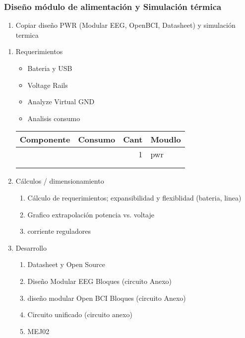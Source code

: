 \documentclass[11pt]{article}
\begin{document}
\subsubsection{Diseño módulo de alimentación y Simulación térmica}
\label{sec:org45edac0}
\begin{enumerate}
\item Copiar diseño PWR (Modular EEG, OpenBCI, Datasheet) y simulación termica\\
\end{enumerate}
\begin{enumerate}
\item Requerimientos
\label{sec:orgaa212fe}
\begin{itemize}
\item Bateria y USB\\
\item Voltage Rails\\
\item Analyze Virtual GND\\
\item Analisis consumo\\
\end{itemize}
\begin{center}
\begin{tabular}{llrl}
Componente & Consumo & Cant & Moudlo\\
\hline
 &  & 1 & pwr\\
 &  &  & \\
 &  &  & \\
\end{tabular}
\end{center}
\item Cálculos / dimensionamiento
\label{sec:org7f2147a}
\begin{enumerate}
\item Cálculo de requerimientos; expansibilidad y flexiblidad (bateria, linea)\\
\item Grafico extrapolación potencia vs. voltaje\\
\item corriente reguladores\\
\end{enumerate}
\item Desarrollo
\label{sec:orga5c539d}
\begin{enumerate}
\item Datasheet y Open Source\\
\item Diseño Modular EEG Bloques (circuito Anexo)\\
\item diseño modular Open BCI Bloques (circuito Anexo)\\
\item Circuito unificado (circuito anexo)\\
\item MEJ02\\
\end{enumerate}
\end{enumerate}
\end{document}
